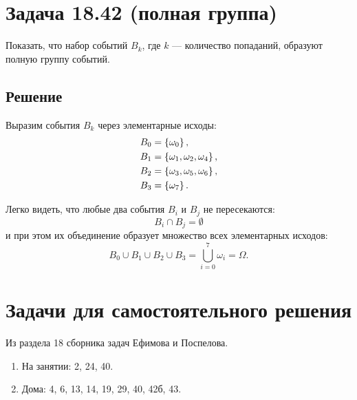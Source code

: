 \section*{Задача 18.42 (полная группа)}

Показать, что набор событий $B_k$, где $k$ --- количество попаданий, образуют полную группу событий.

\subsection*{Решение}

Выразим события $B_k$ через элементарные исходы:
\begin{align}
    B_0 & = \left \{  \omega_0  \right \}, \\
    B_1 & = \left \{  \omega_1, \omega_2, \omega_4  \right \}, \\
    B_2 & = \left \{  \omega_3, \omega_5, \omega_6  \right \}, \\
    B_3 & = \left \{  \omega_7  \right \}.
\end{align}

Легко видеть, что любые два события $B_i$ и $B_j$ не пересекаются:
\[
    B_i \cap B_j = \emptyset
\]
и при этом их объединение образует множество всех элементарных исходов:
\[
    B_0 \cup B_1 \cup B_2 \cup B_3 = \bigcup_{i=0}^7 \omega_i = \Omega .
\]
\section*{Задачи для самостоятельного решения}

Из раздела 18 сборника задач Ефимова и Поспелова.
\begin{enumerate}
    \item На занятии: 2, 24, 40.
    \item Дома: 4, 6, 13, 14, 19, 29, 40, 42б, 43.
\end{enumerate}